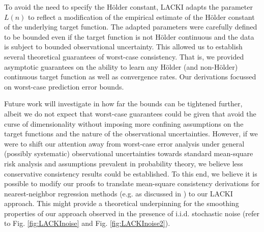 To avoid the need to specify the H\"older constant, LACKI adapts the parameter $L(n)$ to reflect a modification of the empirical estimate of the H\"older constant of the underlying target function. 
The adapted parameters were carefully defined to be bounded even if the target function is not H\"older continuous and the data is subject to bounded observational uncertainty.
This allowed us to establish several theoretical guarantees of worst-case consistency. That is, we provided asymptotic guarantees on the ability to learn any H\"older (and non-H\"older) continuous target function as well as convergence rates. Our derivations focussed on worst-case prediction error bounds.

Future work will investigate in how far the bounds can be tightened further, albeit we do not expect that worst-case guarantees could be given that avoid the curse of dimensionality without imposing more confining assumptions on the target functions and the nature of the observational uncertainties. 
However, if we were to shift our attention away from worst-case error analysis under general (possibly systematic) observational uncertainties towards standard mean-square risk analysis and assumptions prevalent in probability theory, we believe less conservative consistency results could be established. 
To this end, we believe it is possible to modify our proofs to translate mean-square consistency derivations for nearest-neighbor regression methods (e.g. as discussed in \cite{Gyoerfi2002}) to our LACKI approach. This might provide a theoretical underpinning for the smoothing properties of our approach observed in the presence of i.i.d. stochastic noise (refer to Fig. \ref{fig:LACKInoise} and Fig. \ref{fig:LACKInoise2}). 



